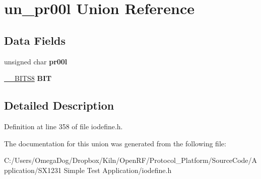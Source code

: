 \hypertarget{unionun__pr00l}{\section{un\-\_\-pr00l Union Reference}
\label{unionun__pr00l}
}
\subsection*{Data Fields}
\begin{DoxyCompactItemize}
\item 
\hypertarget{unionun__pr00l_ace5d70f17efec33861738ec9c499493d}{unsigned char {\bfseries pr00l}}\label{unionun__pr00l_ace5d70f17efec33861738ec9c499493d}

\item 
\hypertarget{unionun__pr00l_a74b57ddf7f47248c677e09109168a98d}{\hyperlink{struct_____b_i_t_s8}{\-\_\-\-\_\-\-B\-I\-T\-S8} {\bfseries B\-I\-T}}\label{unionun__pr00l_a74b57ddf7f47248c677e09109168a98d}

\end{DoxyCompactItemize}


\subsection{Detailed Description}


Definition at line 358 of file iodefine.\-h.



The documentation for this union was generated from the following file\-:\begin{DoxyCompactItemize}
\item 
C\-:/\-Users/\-Omega\-Dog/\-Dropbox/\-Kiln/\-Open\-R\-F/\-Protocol\-\_\-\-Platform/\-Source\-Code/\-Application/\-S\-X1231 Simple Test Application/iodefine.\-h\end{DoxyCompactItemize}
